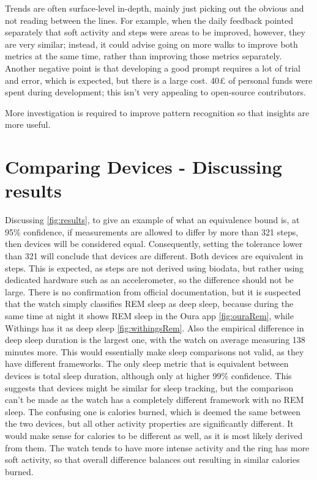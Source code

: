 Trends are often surface-level in-depth, mainly just picking out the obvious and not reading between the lines. For example, when the daily feedback pointed separately that soft activity and steps were areas to be improved, however, they are very similar; instead, it could advise going on more walks to improve both metrics at the same time, rather than improving those metrics separately. Another negative point is that developing a good prompt requires a lot of trial and error, which is expected, but there is a large cost. 40£ of personal funds were spent during development; this isn't very appealing to open-source contributors.

More investigation is required to improve pattern recognition so that insights are more useful.
\section{Comparing Devices - Discussing results}
Discussing \ref{fig:results}, to give an example of what an equivalence bound is, at 95\% confidence, if measurements are allowed to differ by more than 321 steps, then devices will be considered equal. Consequently, setting the tolerance lower than 321 will conclude that devices are different. Both devices are equivalent in steps. This is expected, as steps are not derived using biodata, but rather using dedicated hardware such as an accelerometer, so the difference should not be large. There is no confirmation from official documentation, but it is suspected that the watch simply classifies REM sleep as deep sleep, because during the same time at night it shows REM sleep in the Oura app \ref{fig:ouraRem}, while Withings has it as deep sleep \ref{fig:withingsRem}. Also the empirical difference in deep sleep duration is the largest one, with the watch on average measuring 138 minutes more. This would essentially make sleep comparisons not valid, as they have different frameworks. The only sleep metric that is equivalent between devices is total sleep duration, although only at higher 99\% confidence. This suggests that devices might be similar for sleep tracking, but the comparison can't be made as the watch has a completely different framework with no REM sleep.  The confusing one is calories burned, which is deemed the same between the two devices, but all other activity properties are significantly different. It would make sense for calories to be different as well, as it is most likely derived from them. The watch tends to have more intense activity and the ring has more soft activity, so that overall difference balances out resulting in similar calories burned.
